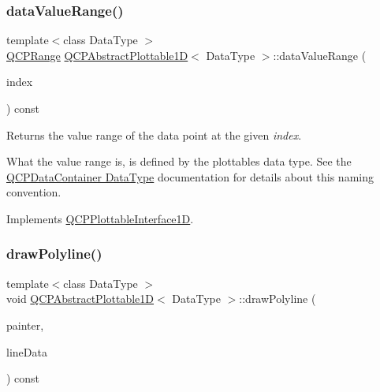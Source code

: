 \subsubsection{\texorpdfstring{data\+Value\+Range()}{dataValueRange()}\hspace{0.1cm}{\footnotesize\ttfamily [2/2]}}
{\footnotesize\ttfamily template$<$class Data\+Type $>$ \\
\hyperlink{class_q_c_p_range}{Q\+C\+P\+Range} \hyperlink{class_q_c_p_abstract_plottable1_d}{Q\+C\+P\+Abstract\+Plottable1D}$<$ Data\+Type $>$\+::data\+Value\+Range (\begin{DoxyParamCaption}\item[{int}]{index }\end{DoxyParamCaption}) const\hspace{0.3cm}{\ttfamily [virtual]}}





Returns the value range of the data point at the given {\itshape index}.

What the value range is, is defined by the plottable\textquotesingle{}s data type. See the \hyperlink{class_q_c_p_data_container_qcpdatacontainer-datatype}{Q\+C\+P\+Data\+Container Data\+Type} documentation for details about this naming convention. 

Implements \hyperlink{class_q_c_p_plottable_interface1_d_a9ca7fcf14d885a200879768679b19be9}{Q\+C\+P\+Plottable\+Interface1D}.

\mbox{\label{class_q_c_p_abstract_plottable1_d_a7adc6c3cccebb5341f11e0c2b7d54206}} 
\subsubsection{\texorpdfstring{draw\+Polyline()}{drawPolyline()}}
{\footnotesize\ttfamily template$<$class Data\+Type $>$ \\
void \hyperlink{class_q_c_p_abstract_plottable1_d}{Q\+C\+P\+Abstract\+Plottable1D}$<$ Data\+Type $>$\+::draw\+Polyline (\begin{DoxyParamCaption}\item[{\hyperlink{class_q_c_p_painter}{Q\+C\+P\+Painter} $\ast$}]{painter,  }\item[{const \hyperlink{class_q_vector}{Q\+Vector}$<$ Q\+PointF $>$ \&}]{line\+Data }\end{DoxyParamCaption}) const\hspace{0.3cm}{\ttfamily [protected]}}

